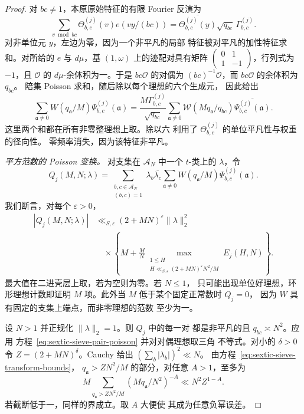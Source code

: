 \documentclass[11pt,a4paper]{article}
\numberwithin{equation}{section}
\numberwithin{figure}{section}
\theoremstyle{definition}
\theoremstyle{remark}
\begin{document}
\begin{proof}
对 $bc\ne1$，本原原始特征的有限 Fourier 反演为
\[
 \sum_{v\bmod bc}\Theta_{b,c}^{(j)}(v)e(vy/(bc))
 =\overline{\Theta_{b,c}^{(j)}(y)}\sqrt{q_{bc}}\,
       \Gamma_{b,c}^{(j)}.
\]
对非单位元 $y$，左边为零，因为一个非平凡的局部
特征被对平凡的加性特征求和。对所给的
$e$ 与 $d\mu$，基 $(1,\omega)$ 上的迹配对具有矩阵
$\left(\begin{smallmatrix}0&1\\1&-1\end{smallmatrix}\right)$，行列式为
$-1$，且 $\mathcal O$ 的 $d\mu$-余体积为一。于是
$bc\mathcal O$ 的对偶为 $(bc)^{-1}\mathcal O$，而
$bc\mathcal O$ 的余体积为 $q_{bc}$。
陪集 Poisson 求和，随后除以每个理想的六个生成元，
因此给出
\begin{equation}\label{eq:sextic-sieve-pair-poisson}
 \sum_{\mathfrak a\ne0}W(q_{\mathfrak a}/M)\Psi_{b,c}^{(j)}(\mathfrak a)
 =\frac{M\Gamma_{b,c}^{(j)}}{\sqrt{q_{bc}}}
   \sum_{\mathfrak a\ne0}\mathscr W(Mq_{\mathfrak a}/q_{bc})
                 \overline{\Psi_{b,c}^{(j)}(\mathfrak a)}.
\end{equation}
这里两个和都在所有非零整理想上取。除以六
利用了 $\Theta_{b,c}^{(j)}$ 的单位平凡性与权重的径向性。
零频率消失，因为该特征非平凡。

\medskip\noindent\emph{平方范数的 Poisson 变换。}
对支集在 $\mathcal A_N$ 中一个 $t$-类上的 $\lambda$，令
\[
 Q_j(M,N;\lambda)=
 \sum_{\substack{b,c\in\mathcal A_N\\(b,c)=1}}
   \lambda_b\overline{\lambda_c}
   \sum_{\mathfrak a\ne0}W(q_{\mathfrak a}/M)
                         \Psi_{b,c}^{(j)}(\mathfrak a).
\]
我们断言，对每个 $\varepsilon>0$，
\begin{equation}\label{eq:sextic-sieve-pair-norm}
 \begin{split}
 |Q_j(M,N;\lambda)|
 &\ll_{S,\varepsilon}(2+MN)^\varepsilon\|\lambda\|_2^2\\
 &\quad\times
 \left\{M+\frac MN
   \max_{\substack{1\le H\\
       H\ll_{S,\varepsilon}(2+MN)^\varepsilon N^2/M}}
       E_j(H,N)\right\}.
 \end{split}
\end{equation}
最大值在二进壳层上取，若为空则为零。若 $N\le1$，
只可能出现单位好理想，环形理想计数即证明
$M$ 项。此外当 $M$ 低于某个固定正常数时 $Q_j=0$，
因为 $W$ 具有固定的支集上端点，而非零理想的范数
至少为一。

设 $N>1$ 并正规化 $\|\lambda\|_2=1$。则 $Q_j$ 中的每一对
都是非平凡的且 $q_{bc}\asymp N^2$。应用
方程~\eqref{eq:sextic-sieve-pair-poisson} 并对对偶理想取三角
不等式。对小的 $\delta>0$ 令
$Z=(2+MN)^\delta$。Cauchy 给出 $(\sum_b|\lambda_b|)^2\ll N$。
由方程~\eqref{eq:sextic-sieve-transform-bounds}，
$q_{\mathfrak a}>ZN^2/M$ 的部分，对任意 $A>1$，至多为
\[
 M\sum_{q_{\mathfrak a}>ZN^2/M}(Mq_{\mathfrak a}/N^2)^{-A}
 \ll N^2Z^{1-A}.
\]
若截断低于一，同样的界成立。取 $A$ 大便使
其成为任意负幂误差。


\end{proof}
\end{document}
